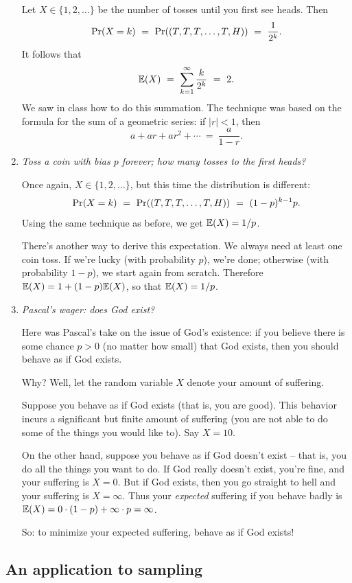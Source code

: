 \begin{enumerate}
Let $X \in \{1,2,\ldots\}$ be the number of tosses until you first see heads. Then
$$ \pr(X = k)
\ = \ 
\pr((T,T,T,\ldots,T,H))
\ = \ 
\frac{1}{2^k}.
$$
It follows that 
$$ \E(X) 
\ = \ 
\sum_{k=1}^\infty \frac{k}{2^k} 
\ = \ 
2.
$$
We saw in class how to do this summation. The technique was based on the formula for the
sum of a geometric series: if $|r| < 1$, then
$$ a + ar + ar^2 + \cdots \ = \ \frac{a}{1-r}.$$

\item {\it Toss a coin with bias $p$ forever; how many tosses to the first heads?}

Once again, $X \in \{1,2,\ldots\}$, but this time the distribution is different:
$$ \pr(X = k)
\ = \ 
\pr((T,T,T,\ldots,T,H))
\ = \ 
(1-p)^{k-1}p.
$$
Using the same technique as before, we get $\mathbb{E}(X) = 1/p$.

There's another way to derive this expectation. We always need at least one coin toss.
If we're lucky (with probability $p$), we're done; otherwise (with probability $1-p$),
we start again from scratch. Therefore $\mathbb{E}(X) = 1 + (1-p) \mathbb{E}(X)$, so that $\mathbb{E}(X) = 1/p$.

\item {\it Pascal's wager: does God exist?}

Here was Pascal's take on the issue of God's existence: if you believe there is
some chance $p > 0$ (no matter how small) that God exists, then you should behave
as if God exists.

Why? Well, let the random variable $X$ denote your amount of suffering.

Suppose you behave as if God exists (that is, you are good). This behavior incurs
a significant but finite amount of suffering (you are not able to do some of the
things you would like to). Say $X = 10$.

On the other hand, suppose you behave as if God doesn't exist -- that is, you 
do all the things you want to do. If God really doesn't exist, you're fine, and 
your suffering is $X = 0$. But if God exists, then you go straight to hell
and your suffering is $X = \infty$. Thus your {\it expected} suffering
if you behave badly is $\mathbb{E}(X) = 0 \cdot (1-p) + \infty \cdot p = \infty$.

So: to minimize your expected suffering, behave as if God exists!

\end{enumerate}


\subsection{An application to sampling}

